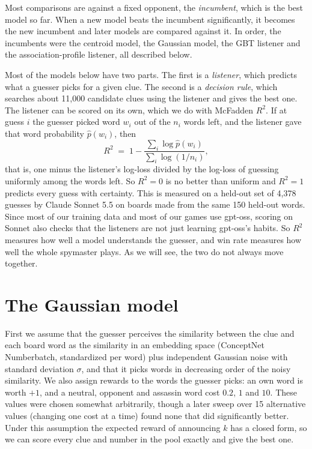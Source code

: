 \documentclass[11pt]{article}
\begin{document}
Most comparisons are against a fixed opponent, the \emph{incumbent}, which is
the best model so far. When a new model beats the incumbent significantly, it
becomes the new incumbent and later models are compared against it. In order,
the incumbents were the centroid model, the Gaussian model, the GBT listener and
the association-profile listener, all described below.

Most of the models below have two parts. The first is a \emph{listener}, which
predicts what a guesser picks for a given clue. The second is a \emph{decision
rule}, which searches about 11,000 candidate clues using the listener and gives
the best one. The listener can be scored on its own, which we do with McFadden
$R^2$. If at guess $i$ the guesser picked word $w_i$ out of the $n_i$ words left,
and the listener gave that word probability $\hat p(w_i)$, then
\[
R^2 \;=\; 1 - \frac{\sum_i \log \hat p(w_i)}{\sum_i \log (1/n_i)},
\]
that is, one minus the listener's log-loss divided by the log-loss of guessing
uniformly among the words left. So $R^2 = 0$ is no better than uniform and
$R^2 = 1$ predicts every guess with certainty. This is measured on a held-out
set of 4,378 guesses by Claude Sonnet 5.5 on boards made from the same 150
held-out words. Since most of our training data and most of our games use
gpt-oss, scoring on Sonnet also checks that the listeners are not just learning
gpt-oss's habits. So $R^2$ measures how well a model understands the guesser,
and win rate measures how well the whole spymaster plays. As we will see, the
two do not always move together.

\section{The Gaussian model}

First we assume that the guesser perceives the similarity between the clue and
each board word as the similarity in an embedding space (ConceptNet Numberbatch,
standardized per word) plus independent Gaussian noise with standard deviation
$\sigma$, and that it picks words in decreasing order of the noisy similarity. We
also assign rewards to the words the guesser picks: an own word is worth $+1$,
and a neutral, opponent and assassin word cost $0.2$, $1$ and $10$. These values
were chosen somewhat arbitrarily, though a later sweep over 15 alternative values
(changing one cost at a time) found none that did significantly better. Under
this assumption the expected reward of announcing $k$ has a closed form, so we
can score every clue and number in the pool exactly and give the best one.
\end{document}
